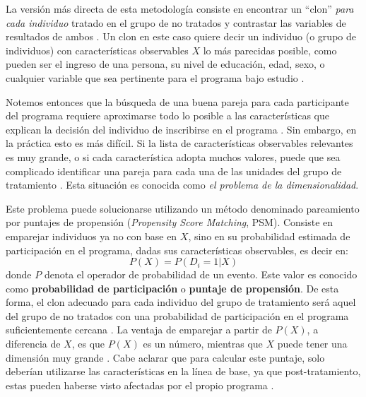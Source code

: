\documentclass[../../main.tex]{subfiles}
\begin{document}
La versión más directa de esta metodología consiste en encontrar un ``clon'' \textit{para
cada individuo} tratado en el grupo de no tratados y contrastar las variables de
resultados de ambos \cite{bernal}. Un clon en este caso quiere decir un individuo (o grupo
de individuos) con características observables \(X\) lo más parecidas posible, como pueden
ser el ingreso de una persona, su nivel de educación, edad, sexo, o cualquier variable que
sea pertinente para el programa bajo estudio \cite{bernal}. 

Notemos entonces que la búsqueda de una buena pareja para cada participante del programa
requiere aproximarse todo lo posible a las características que explican la decisión del
individuo de inscribirse en el programa \cite{gertler-2016}. Sin embargo, en la práctica
esto es más difícil. Si la lista de características observables relevantes es muy grande,
o si cada característica adopta muchos valores, puede que sea complicado identificar una
pareja para cada una de las unidades del grupo de tratamiento \cite{gertler-2016}. Esta
situación es conocida como \textit{el problema de la dimensionalidad}.

Este problema puede solucionarse utilizando un método denominado pareamiento por puntajes
de propensión (\textit{Propensity Score Matching}, PSM). Consiste en emparejar individuos
ya no con base en \(X\), sino en su probabilidad estimada de participación en el programa,
dadas sus características observables, es decir en:
\[P(X) = P(D_i = 1|X)\]
donde \(P\) denota el operador de probabilidad de un evento. Este
valor es conocido como \textbf{probabilidad de participación} o \textbf{puntaje de
propensión}. De esta forma, el clon adecuado para cada individuo del grupo de tratamiento
será aquel del grupo de no tratados con una probabilidad de participación en el programa
suficientemente cercana \cite{bernal}. La ventaja de emparejar a partir de \(P(X)\), a
diferencia de \(X\), es que \(P(X)\) es un número, mientras que \(X\) puede tener una
dimensión muy grande \cite{bernal}. Cabe aclarar que para calcular este puntaje, solo
deberían utilizarse las características en la línea de base, ya que post-tratamiento,
estas pueden haberse visto afectadas por el propio programa \cite{gertler-2016}.

\end{document}
